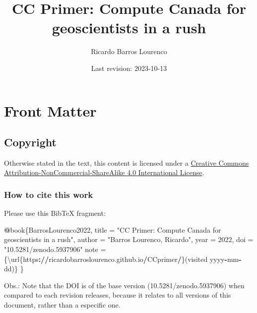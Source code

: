 \documentclass[
]{book}
\title{CC Primer: Compute Canada for geoscientists in a rush}
\author{Ricardo Barros Lourenco}
\date{Last revision: 2023-10-13}
\newenvironment{Shaded}{\begin{snugshade}}{\end{snugshade}}
\newcommand{\DecValTok}[1]{\textcolor[rgb]{0.00,0.00,0.81}{#1}}
\newcommand{\ErrorTok}[1]{\textcolor[rgb]{0.64,0.00,0.00}{\textbf{#1}}}
\newcommand{\NormalTok}[1]{#1}
\newcommand{\OtherTok}[1]{\textcolor[rgb]{0.56,0.35,0.01}{#1}}
\newcommand{\SpecialCharTok}[1]{\textcolor[rgb]{0.81,0.36,0.00}{\textbf{#1}}}
\newcommand{\StringTok}[1]{\textcolor[rgb]{0.31,0.60,0.02}{#1}}
\begin{document}
\maketitle

{
\setcounter{tocdepth}{1}
\tableofcontents
}
\hypertarget{front-matter}{%
\chapter{Front Matter}\label{front-matter}}

\hypertarget{copyright}{%
\section{Copyright}\label{copyright}}

Otherwise stated in the text, this content is licensed under a \href{http://creativecommons.org/licenses/by-nc-sa/4.0/}{Creative Commons Attribution-NonCommercial-ShareAlike 4.0 International License}.

\hypertarget{how-to-cite-this-work}{%
\subsection{How to cite this work}\label{how-to-cite-this-work}}

Please use this BibTeX fragment:

\begin{Shaded}
\begin{Highlighting}[]
\SpecialCharTok{@}\NormalTok{book\{BarrosLourenco2022,}
\NormalTok{  title     }\OtherTok{=} \StringTok{"CC Primer: Compute Canada for geoscientists in a rush"}\NormalTok{,}
\NormalTok{  author    }\OtherTok{=} \StringTok{"Barros Lourenco, Ricardo"}\NormalTok{,}
\NormalTok{  year      }\OtherTok{=} \DecValTok{2022}\NormalTok{,}
\NormalTok{  doi       }\OtherTok{=} \StringTok{"10.5281/zenodo.5937906"}
\NormalTok{  note      }\OtherTok{=}\NormalTok{ \{\textbackslash{}url\{https}\SpecialCharTok{:}\ErrorTok{//}\NormalTok{ricardobarroslourenco.github.io}\SpecialCharTok{/}\NormalTok{CCprimer}\SpecialCharTok{/}\NormalTok{\}(visited yyyy}\SpecialCharTok{{-}}\NormalTok{mm}\SpecialCharTok{{-}}\NormalTok{dd)\}}
\NormalTok{\}}
\end{Highlighting}
\end{Shaded}

Obs.: Note that the DOI is of the base version (10.5281/zenodo.5937906) when
compared to each revision releases, because it relates to all versions
of this document, rather than a especific one.
\end{document}
